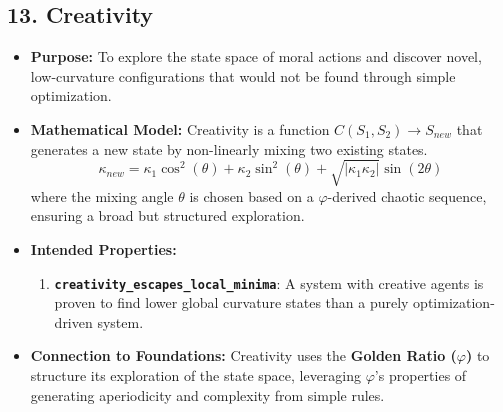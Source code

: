 \documentclass[11pt,a4paper]{article}
\begin{document}
\begin{itemize}
\subsection{13. Creativity}
\begin{itemize}
    \item \textbf{Purpose:} To explore the state space of moral actions and discover novel, low-curvature configurations that would not be found through simple optimization.
    \item \textbf{Mathematical Model:} Creativity is a function $C(S_1, S_2) \to S_{new}$ that generates a new state by non-linearly mixing two existing states.
        \[ \kappa_{new} = \kappa_1 \cos^2(\theta) + \kappa_2 \sin^2(\theta) + \sqrt{|\kappa_1 \kappa_2|} \sin(2\theta) \]
        where the mixing angle $\theta$ is chosen based on a $\varphi$-derived chaotic sequence, ensuring a broad but structured exploration.
    \item \textbf{Intended Properties:}
        \begin{enumerate}
            \item \textbf{\texttt{creativity\_escapes\_local\_minima}}: A system with creative agents is proven to find lower global curvature states than a purely optimization-driven system.
        \end{enumerate}
    \item \textbf{Connection to Foundations:} Creativity uses the \textbf{Golden Ratio ($\varphi$)} to structure its exploration of the state space, leveraging $\varphi$'s properties of generating aperiodicity and complexity from simple rules.
\end{itemize}


\end{itemize}
\end{document}

